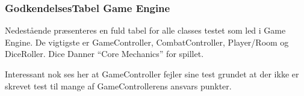 \subsubsection{GodkendelsesTabel Game Engine}
Nedestående præsenteres en fuld tabel for alle classes testet som 
led i Game Engine. De vigtigste er GameController, CombatController,
Player/Room og DiceRoller. Dice Danner ``Core Mechanics'' for spillet.

Interessant nok ses her at GameController fejler sine test grundet at
der ikke er skrevet test til mange af GameControllerens ansvars punkter.

\vspace{-1em}
